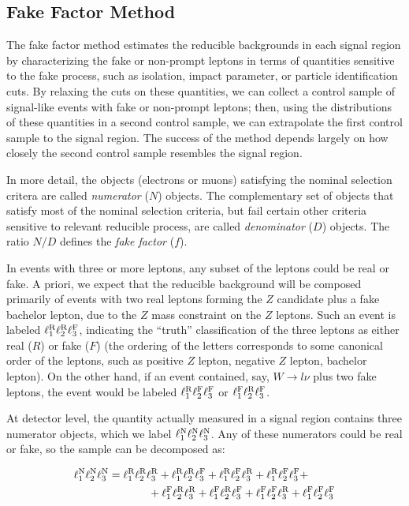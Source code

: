 \subsection{Fake Factor Method}\label{sec:model-independent-fake-factor-method}
The fake factor method estimates the reducible backgrounds in each signal region by characterizing the fake or non-prompt leptons in terms of quantities sensitive to the fake process, such as isolation, impact parameter, or particle identification cuts. By relaxing the cuts on these quantities, we can collect a control sample of signal-like events with fake or non-prompt leptons; then, using the distributions of these quantities in a second control sample, we can extrapolate the first control sample to the signal region. The success of the method depends largely on how closely the second control sample resembles the signal region. 

In more detail, the objects (electrons or muons) satisfying the nominal selection critera are called \emph{numerator} ($N$) objects. The complementary set of objects that satisfy most of the nominal selection criteria, but fail certain other criteria sensitive to relevant reducible process, are called \emph{denominator} ($D$) objects. The ratio $N/D$ defines the \emph{fake factor} ($f$). 

In events with three or more leptons, any subset of the leptons could be real or fake. A priori, we expect that the reducible background will be composed primarily of events with two real leptons forming the $Z$ candidate plus a fake bachelor lepton, due to the $Z$ mass constraint on the $Z$ leptons. Such an event is labeled $\ell_{1}^{\mathrm{R}}\ell_{2}^{\mathrm{R}}\ell_{3}^{\mathrm{F}}$, indicating the ``truth'' classification of the three leptons as either real ($R$) or fake ($F$) (the ordering of the letters corresponds to some canonical order of the leptons, such as positive $Z$ lepton, negative $Z$ lepton, bachelor lepton). On the other hand, if an event contained, say, $W\rightarrow l\nu$ plus two fake leptons, the event would be labeled $\ell_{1}^{\mathrm{R}}\ell_{2}^{\mathrm{F}}\ell_{3}^{\mathrm{F}}$ or $\ell_{1}^{\mathrm{F}}\ell_{2}^{\mathrm{R}}\ell_{3}^{\mathrm{F}}$. 

At detector level, the quantity actually measured in a signal region contains three numerator objects, which we label $\ell_{1}^{\mathrm{N}}\ell_{2}^{\mathrm{N}}\ell_{3}^{\mathrm{N}}$. Any of these numerators could be real or fake, so the sample can be decomposed as:

\begin{align}
	\ell_{1}^{\mathrm{N}}\ell_{2}^{\mathrm{N}}\ell_{3}^{\mathrm{N}} & = \ell_{1}^{\mathrm{R}}\ell_{2}^{\mathrm{R}}\ell_{3}^{\mathrm{R}} + \ell_{1}^{\mathrm{R}}\ell_{2}^{\mathrm{R}}\ell_{3}^{\mathrm{F}} + \ell_{1}^{\mathrm{R}}\ell_{2}^{\mathrm{F}}\ell_{3}^{\mathrm{R}} + \ell_{1}^{\mathrm{R}}\ell_{2}^{\mathrm{F}}\ell_{3}^{\mathrm{F}} +\\
	&  \hspace{0.5in} + \ell_{1}^{\mathrm{F}}\ell_{2}^{\mathrm{R}}\ell_{3}^{\mathrm{R}} + \ell_{1}^{\mathrm{F}}\ell_{2}^{\mathrm{R}}\ell_{3}^{\mathrm{F}} + \ell_{1}^{\mathrm{F}}\ell_{2}^{\mathrm{F}}\ell_{3}^{\mathrm{R}} + \ell_{1}^{\mathrm{F}}\ell_{2}^{\mathrm{F}}\ell_{3}^{\mathrm{F}}
\end{align}

